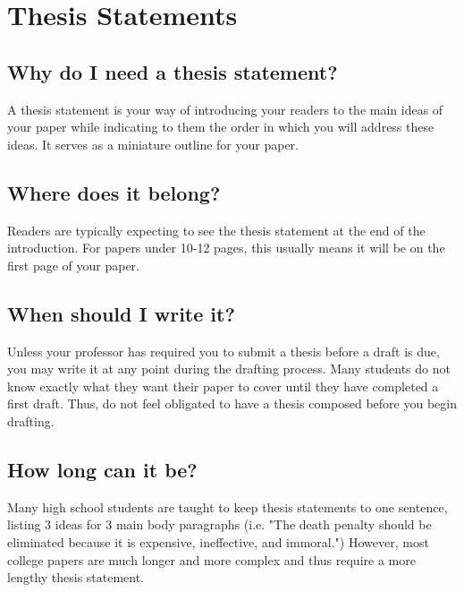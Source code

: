 
\chapter{Thesis Statements}

\section{Why do I need a thesis statement?}

A thesis statement is your way of introducing your readers to the main ideas of your 
paper while indicating to them the order in which you will address these ideas. It serves 
as a miniature outline for your paper.

\section{Where does it belong?}

Readers are typically expecting to see the thesis statement at the end of the 
introduction. For papers under 10-12 pages, this usually means it will be on the first 
page of your paper.

\section{When should I write it?}

Unless your professor has required you to submit a thesis before a draft is due, you 
may write it at any point during the drafting process. Many students do not know exactly 
what they want their paper to cover until they have completed a first draft. Thus, do 
not feel obligated to have a thesis composed before you begin drafting.

\section{How long can it be?}

Many high school students are taught to keep thesis statements to one sentence, 
listing 3 ideas for 3 main body paragraphs (i.e. "The death penalty should be eliminated 
because it is expensive, ineffective, and immoral.") However, most college papers are 
much longer and more complex and thus require a more lengthy thesis statement.

